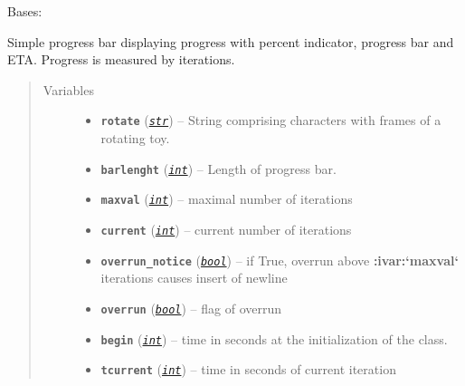 \documentclass[a4paper,10pt,english]{sphinxmanual}
\begin{document}
\begin{fulllineitems}
\label{aqueduct.utils.clui:aqueduct.utils.clui.SimpleProgressBar}
Bases: \href{http://docs.python.org/2/library/functions.html\#object}{}

Simple progress bar displaying progress with percent indicator, progress bar and ETA.
Progress is measured by iterations.
\begin{quote}\begin{description}
\item[{Variables}] \leavevmode\begin{itemize}
\item {} 
\textbf{\texttt{rotate}} (\href{http://docs.python.org/2/library/functions.html\#str}{\emph{\texttt{str}}}) -- String comprising characters with frames of a rotating toy.

\item {} 
\textbf{\texttt{barlenght}} (\href{http://docs.python.org/2/library/functions.html\#int}{\emph{\texttt{int}}}) -- Length of progress bar.

\item {} 
\textbf{\texttt{maxval}} (\href{http://docs.python.org/2/library/functions.html\#int}{\emph{\texttt{int}}}) -- maximal number of iterations

\item {} 
\textbf{\texttt{current}} (\href{http://docs.python.org/2/library/functions.html\#int}{\emph{\texttt{int}}}) -- current number of iterations

\item {} 
\textbf{\texttt{overrun\_notice}} (\href{http://docs.python.org/2/library/functions.html\#bool}{\emph{\texttt{bool}}}) -- if True, overrun above {\color{red}\bfseries{}:ivar:{}`maxval{}`} iterations causes insert of newline

\item {} 
\textbf{\texttt{overrun}} (\href{http://docs.python.org/2/library/functions.html\#bool}{\emph{\texttt{bool}}}) -- flag of overrun

\item {} 
\textbf{\texttt{begin}} (\href{http://docs.python.org/2/library/functions.html\#int}{\emph{\texttt{int}}}) -- time in seconds at the initialization of the {\hyperref[aqueduct.utils.clui:aqueduct.utils.clui.SimpleProgressBar]{}} class.

\item {} 
\textbf{\texttt{tcurrent}} (\href{http://docs.python.org/2/library/functions.html\#int}{\emph{\texttt{int}}}) -- time in seconds of current iteration


\end{itemize}
\end{description}
\end{quote}
\end{fulllineitems}
\end{document}
